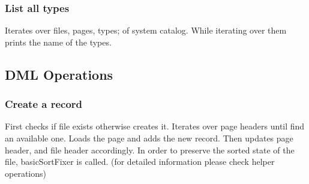 \documentclass{article}
\begin{document}
\subsubsection{List all types}
Iterates over files, pages, types; of system catalog. While iterating over them prints the name of the types.

\begin{algorithm}[H]
\end{algorithm}
\newpage
\subsection{DML Operations}
\subsubsection{Create a record}
First checks if file exists otherwise creates it. Iterates over page headers until find an available one. Loads the page and adds the new record. Then updates page header, and file header accordingly. In order to preserve the sorted state of the file, basicSortFixer is called. (for detailed information please check helper operations)
\end{document}
